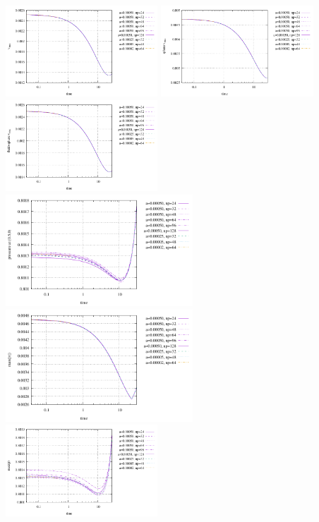 \begin{center}
\includegraphics[width=5.7cm]{python_codes/fieldstone_93/results_exp2/vrms}
\includegraphics[width=5.7cm]{python_codes/fieldstone_93/results_exp2/vrms_sphere}
\includegraphics[width=5.7cm]{python_codes/fieldstone_93/results_exp2/vrms_fluidsphere}\\
\includegraphics[width=7cm]{python_codes/fieldstone_93/results_exp2/p_bottom}
\includegraphics[width=7cm]{python_codes/fieldstone_93/results_exp2/max_vel}\\
\includegraphics[width=5.7cm]{python_codes/fieldstone_93/results_exp2/max_press}

\end{center}
